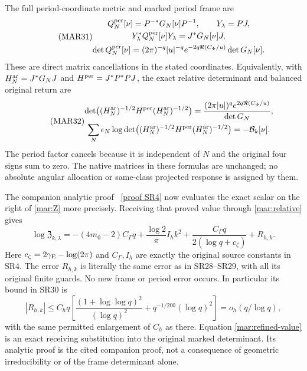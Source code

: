 \documentclass[11pt]{article}
\begin{document}
The full period-coordinate metric and marked period frame are
\begin{equation}\tag{MAR31}\label{mar:periodmetric}
 \begin{gathered}
 Q_N^{\rm per}[\nu]=P^{-*}G_N[\nu]P^{-1},\qquad Y_\lambda=PJ,\\
 Y_\lambda^*Q_N^{\rm per}[\nu]Y_\lambda=J^*G_N[\nu]J,\\
 \det Q_N^{\rm per}[\nu]
  =(2\pi)^{-q}|u|^{-q}e^{-2q\Re(C_\Phi/u)}\det G_N[\nu].
 \end{gathered}
\end{equation}
These are direct matrix cancellations in the stated coordinates.
Equivalently, with $H_N^{\rm ar}=J^*G_NJ$ and
$H^{\rm per}=J^*P^*PJ$, the exact relative determinant and
balanced original return are
\begin{equation}\tag{MAR32}\label{mar:periodreturn}
 \begin{gathered}
 \det\bigl((H_N^{\rm ar})^{-1/2}H^{\rm per}(H_N^{\rm ar})^{-1/2}\bigr)
 =\frac{(2\pi|u|)^q e^{2q\Re(C_\Phi/u)}}{\det G_N},\\
 \sum_N\epsilon_N\log\det\bigl((H_N^{\rm ar})^{-1/2}
                 H^{\rm per}(H_N^{\rm ar})^{-1/2}\bigr)
              =-\mathcal B_k[\nu].
 \end{gathered}
\end{equation}
The period factor cancels because it is independent of $N$ and
the original four signs sum to zero. The native matrices in
these formulas are unchanged; no absolute angular allocation or
same-class projected response is assigned by them.

The companion analytic proof \cite[SR28--SR30]{signed}%
~\href{https://github.com/KokunoYumeto/zeta-function-research-reader/blob/487253b5b01851da5b9b98af4e146fecf1fab902/workbenches/splitzero-tandem/continuations/20260919-arithmetic-signs-marked-classes/arrival_02/signed_refinement/SLOW_TAIL_AND_NONLINEAR_RECEIVER.tex\#L68}{[proof SR4]}%
{} now evaluates
the exact scalar on the right of \eqref{mar:Z} more precisely.
Receiving that proved value through \eqref{mar:relative} gives
\begin{equation}\tag{MAR33}\label{mar:refined-value}
 \log\mathfrak Z_{k,\lambda}
 =-(4m_0-2)C_\Gamma q+\frac{\log2}{\pi}I_hk^2
       +\frac{C_\Gamma q}{2(\log q+c_\zeta)}+R_{h,k}.
\end{equation}
Here $c_\zeta=2\gamma_{\rm E}-\log(2\pi)$ and $C_\Gamma,I_h$
are exactly the original source constants in SR4. The error
$R_{h,k}$ is literally the same error as in SR28--SR29, with all
its original finite guards. No new frame or period error occurs.
In particular its bound in SR30 is
\[
 |R_{h,k}|\le C_h q\left[
 \frac{(1+\log\log q)^2}{(\log q)^2}
             +q^{-1/200}(\log q)^2\right]=o_h(q/\log q),
\]
with the same permitted enlargement of $C_h$ as there.
Equation \eqref{mar:refined-value} is an exact receiving
substitution into the original marked determinant. Its analytic
proof is the cited companion proof, not a consequence of
geometric irreducibility or of the frame determinant alone.
\end{document}
